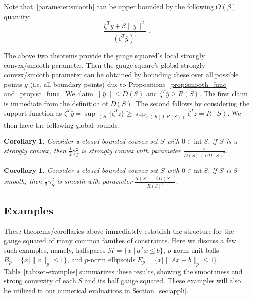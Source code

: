 \documentclass[sn-mathphys,Numbered]{sn-jnl}%
\newtheorem{corollary}[theorem]{Corollary}%
\begin{document}
Note that~\eqref{parameter:smooth} can be upper bounded by the following $O(\beta)$ quantity:
\begin{equation} \label{eq:gauge-smooth-bound}
    \frac{\zeta^T \bar y+\beta \|\bar y\|^2}{(\zeta^T\bar y)^3} \ .
\end{equation}

The above two theorems provide the gauge squared's local strongly convex/smooth parameter. Then the gauge square's global strongly convex/smooth parameter can be obtained by bounding these over all possible points $\bar y$ (i.e. all boundary points) 
due to Propositions~\ref{prop:smooth_func} and~\ref{prop:sc_func}. We claim $\|\bar y\| \leq D(S)$ and $\zeta ^T \bar y \geq R(S)$. The first claim is immediate from the definition of $D(S)$. The second follows by considering the support function as $\zeta ^T \bar y = \sup_{z\in S}\{\zeta^T z\}\geq \sup_{z\in B(0,R(S))}\zeta ^T z = R(S)$. We then have the following global bounds.
\begin{corollary}\label{cor:gauge-strong-convexity-global}
    Consider a closed bounded convex set $S$ with $0\in \mathrm{int\ } S$. If $S$ is $\alpha$-strongly convex, then $\frac{1}{2}\gamma_S^2$ is strongly convex  with parameter
    $\frac{\alpha}{D(S)+\alpha D(S)^2}.
    $
\end{corollary}

\begin{corollary}\label{cor:gauge-smoothness-global}
    Consider a closed bounded convex set $S$ with $0\in \mathrm{int\ } S$. If $S$ is $\beta$-smooth, then $\frac{1}{2}\gamma_S^2$ is smooth with parameter
    $\frac{R(S)+\beta D(S)^2}{R(S)^3}.
    $
\end{corollary}


\subsection{Examples}\label{subsec:ex}
These theorems/corollaries above immediately establish the structure for the gauge squared of many common families of constraints. Here we discuss a few such examples, namely, halfspaces $\mathcal{H} = \{x \mid a^Tx \leq b\}$, $p$-norm unit balls $B_p=\{x \mid \|x\|_p \leq 1\}$, and $p$-norm ellipsoids $E_p=\{x \mid \|Ax-b\|_p \leq 1\}$. Table~\ref{tab:set-examples} summarizes these results, showing the smoothness and strong convexity of each $S$ and its half gauge squared. These examples will also be utilized in our numerical evaluations in Section~\ref{sec:appli}. 
\end{document}
